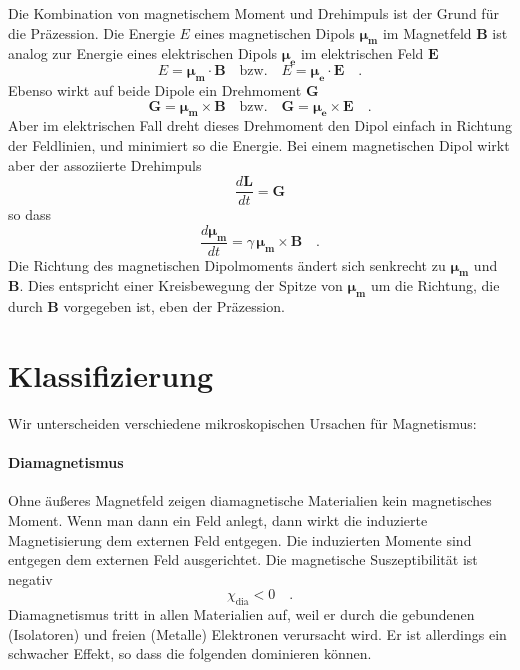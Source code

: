 Die Kombination von magnetischem Moment und Drehimpuls ist der Grund für die  Präzession. Die Energie $E$ eines magnetischen Dipols $\bm{\mu_m}$ im Magnetfeld $\bm{B}$ ist analog zur Energie eines elektrischen Dipols $\bm{\mu_e}$ im elektrischen Feld $\bm{E} $
\begin{equation}
    E = \bm{\mu_m} \cdot \bm{B} \quad  \text{bzw.} \quad  E = \bm{\mu_e} \cdot \bm{E}  \quad .
\end{equation}
Ebenso wirkt auf beide Dipole ein Drehmoment $\bm{G}$
\begin{equation}
    \bm{G} = \bm{\mu_m} \times \bm{B} \quad  \text{bzw.} \quad   \bm{G} = \bm{\mu_e} \times \bm{E} \quad .
\end{equation}
Aber im elektrischen Fall dreht dieses Drehmoment den Dipol einfach in Richtung der Feldlinien, und minimiert so die Energie. Bei einem magnetischen Dipol wirkt aber der assoziierte Drehimpuls
\begin{equation}
    \frac{d\bm{L}}{dt} =  \bm{G}
\end{equation}
so dass 
\begin{equation}
    \frac{d \bm{\mu_m}}{dt} = \gamma \, \bm{\mu_m} \times \bm{B} \quad .
\end{equation}
Die Richtung des magnetischen Dipolmoments ändert sich senkrecht zu $\bm{\mu_m}$ und  $\bm{B}$. Dies entspricht einer Kreisbewegung der Spitze von $\bm{\mu_m}$ um die Richtung, die durch $\bm{B}$ vorgegeben ist, eben der Präzession.

\section*{Klassifizierung}

Wir unterscheiden verschiedene mikroskopischen Ursachen für Magnetismus:

\paragraph*{Diamagnetismus} Ohne äußeres Magnetfeld zeigen diamagnetische Materialien kein magnetisches Moment. Wenn man dann ein Feld anlegt, dann wirkt die induzierte Magnetisierung dem externen Feld entgegen. Die induzierten Momente sind entgegen dem externen Feld ausgerichtet. Die magnetische Suszeptibilität ist negativ
\begin{equation}
    \chi_\text{dia} < 0 \quad .
\end{equation}
Diamagnetismus tritt in allen Materialien auf, weil er durch die gebundenen (Isolatoren) und freien (Metalle) Elektronen verursacht wird. Er ist allerdings ein schwacher Effekt, so dass die folgenden dominieren können.

